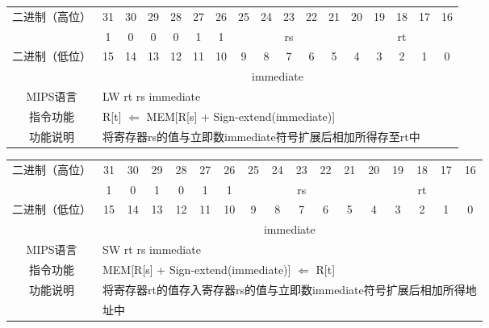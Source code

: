 \begin{table}
\begin{tabular}{|c|c|c|c|c|c|c|c|c|c|c|c|c|c|c|c|c|}
\hline
\multirow{2}{*}{二进制（高位）} &
31&30&29&28&27&26&25&24&23&22&21&20&19&18&17&16\\
\cline{2-17}
&
1&0&0&0&1&
1&
\multicolumn{5}{c|}{rs}&
\multicolumn{5}{c|}{rt}\\
\hline
\multirow{2}{*}{二进制（低位）} &
15&14&13&12&11&10&9&8&7&6&5&4&3&2&1&0\\
\cline{2-17}
&
\multicolumn{16}{c|}{immediate}\\
\hline
MIPS语言&
\multicolumn{16}{l|}{LW rt rs immediate}\\
\hline
指令功能&
\multicolumn{16}{l|}{R[t] $\Leftarrow$ MEM[R[s] + Sign-extend(immediate)]}\\
\hline
功能说明&
\multicolumn{16}{l|}{将寄存器rs的值与立即数immediate符号扩展后相加所得存至rt中}\\
\hline
\end{tabular}
\end{table}

\begin{table}
\begin{tabular}{|c|c|c|c|c|c|c|c|c|c|c|c|c|c|c|c|c|}
\hline
\multirow{2}{*}{二进制（高位）} &
31&30&29&28&27&26&25&24&23&22&21&20&19&18&17&16\\
\cline{2-17}
&
1&0&1&0&1&
1&
\multicolumn{5}{c|}{rs}&
\multicolumn{5}{c|}{rt}\\
\hline
\multirow{2}{*}{二进制（低位）} &
15&14&13&12&11&10&9&8&7&6&5&4&3&2&1&0\\
\cline{2-17}
&
\multicolumn{16}{c|}{immediate}\\
\hline
MIPS语言&
\multicolumn{16}{l|}{SW rt rs immediate}\\
\hline
指令功能&
\multicolumn{16}{l|}{MEM[R[s] + Sign-extend(immediate)] $\Leftarrow$ R[t]}\\
\hline
\multirow{2}{*}{功能说明}&
\multicolumn{16}{l|}{将寄存器rt的值存入寄存器rs的值与立即数immediate符号扩展后相加所得地}\\
&\multicolumn{16}{l|}{址中}\\
\hline
\end{tabular}
\end{table}

